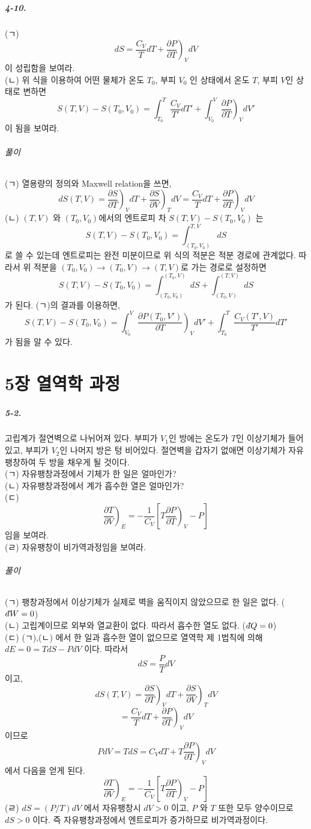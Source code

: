 \documentclass[a4paper,12pt]{report}
\newcommand{\Maxwell}[3][]{\left.\frac{\partial #2}{\partial #3} \right)_{#1} }
\newcommand{\dbar}{d\hspace*{-0.08em}\bar{}\hspace*{0.1em}}
\begin{document}
	 \paragraph{4-10. } (ㄱ)
	 $$dS=\frac{C_V}{T}dT+\Maxwell[V]{P}{T}dV$$ 이 성립함을 보여라.\\
	 (ㄴ) 위 식을 이용하여 어떤 물체가 온도 $T_0$, 부피 $V_0$ 인 상태에서 온도 $T$, 부피 $V$인 상태로 변하면 
	 $$S(T,V)-S(T_0,V_0)=\int_{T_0}^{T}\frac{C_V}{T'}dT'+\int_{V_0}^{V}\Maxwell[V]{P}{T}dV'$$이 됨을 보여라.
	 \subparagraph{풀이} (ㄱ) 열용량의 정의와 Maxwell relation을 쓰면, 
	 $$dS(T,V)=\Maxwell[V]{S}{T}dT+\Maxwell[T]{S}{V}dV=\frac{C_V}{T}dT+\Maxwell[V]{P}{T}dV$$
	 (ㄴ) $(T,V)$ 와 $(T_0,V_0)$에서의 엔트로피 차 $S(T,V)-S(T_0,V_0)$ 는
	 $$S(T,V)-S(T_0,V_0)=\int_{(T_0,V_0)}^{T,V}dS$$로 쓸 수 있는데 엔트로피는 완전 미분이므로 위 식의 적분은 적분 경로에 관계없다. 따라서 위 적분을 $(T_0,V_0)\rightarrow(T_0,V)\rightarrow(T,V)$로 가는 경로로 설정하면
	 $$S(T,V)-S(T_0,V_0)=\int_{(T_0,V_0)}^{(T_0,V)}dS+\int_{(T_0,V)}^{(T,V)}dS$$
	 가 된다. (ㄱ)의 결과를 이용하면, 
	 $$S(T,V)-S(T_0,V_0)=\int_{V_0}^{V}\Maxwell[V]{P(T_0,V')}{T}dV'+\int_{T_0}^{T}\frac{C_V(T',V)}{T'}dT'$$
	 가 됨을 알 수 있다. 
	\chapter*{5장 열역학 과정}
	\paragraph{5-2. } 고립계가 절연벽으로 나뉘어져 있다. 부피가 $V_1$인 방에는 온도가 $T$인 이상기체가 들어있고, 부피가 $V_2$인 나머지 방은 텅 비어있다. 절연벽을 갑자기 없애면 이상기체가 자유팽창하여 두 방을 채우게 될 것이다.\\
	(ㄱ) 자유팽창과정에서 기체가 한 일은 얼마인가?\\
	(ㄴ) 자유팽창과정에서 계가 흡수한 열은 얼마인가?\\
	(ㄷ) $$\Maxwell[E]{T}{V}=-\frac{1}{C_V}\left[T\Maxwell[V]{P}{T}-P \right] $$임을 보여라. \\
	(ㄹ) 자유팽창이 비가역과정임을 보여라. 
	\subparagraph{풀이} (ㄱ) 팽창과정에서 이상기체가 실제로 벽을 움직이지 않았으므로 한 일은 없다. ($\dbar W=0$)\\
	(ㄴ) 고립계이므로 외부와 열교환이 없다. 따라서 흡수한 열도 없다. ($\dbar Q=0$)\\
	(ㄷ) (ㄱ),(ㄴ) 에서 한 일과 흡수한 열이 없으므로 열역학 제 1법칙에 의해 $dE=0=TdS-PdV$ 이다. 따라서
	$$dS=\frac{P}{T}dV$$이고,
	$$dS(T,V)=\Maxwell[V]{S}{T}dT+\Maxwell[T]{S}{V}dV$$
	$$=\frac{C_V}{T}dT+\Maxwell[V]{P}{T}dV$$이므로
	$$PdV=TdS=C_VdT+T\Maxwell[V]{P}{T}dV$$ 에서 다음을 얻게 된다. 
	 $$\Maxwell[E]{T}{V}=-\frac{1}{C_V}\left[T\Maxwell[V]{P}{T}-P \right] $$
	 (ㄹ) $dS=(P/T)dV$ 에서 자유팽창시 $dV>0$ 이고, $P$ 와 $T$ 또한 모두 양수이므로 $dS>0$ 이다. 즉 자유팽창과정에서 엔트로피가 증가하므로 비가역과정이다. 
\end{document}
